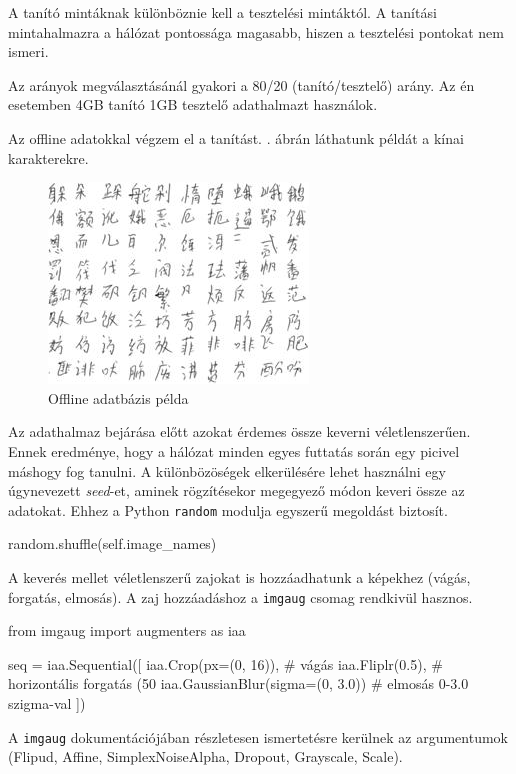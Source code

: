 A tanító mintáknak különböznie kell a tesztelési mintáktól. A tanítási mintahalmazra a hálózat pontossága magasabb, hiszen a tesztelési pontokat nem ismeri.

Az arányok megválasztásánál gyakori a 80/20 (tanító/tesztelő) arány. Az én esetemben 4GB tanító 1GB tesztelő adathalmazt használok.

Az offline adatokkal végzem el a tanítást. . ábrán láthatunk példát a kínai karakterekre.

\begin{figure}[h]
	\centering
	\includegraphics[scale=2.0]{images/offline_dataset}
	\caption{Offline adatbázis példa}
	\label{fig:offline_dataset}
\end{figure} 

Az adathalmaz bejárása előtt azokat érdemes össze keverni véletlenszerűen. Ennek eredménye, hogy a hálózat minden egyes futtatás során egy picivel máshogy fog tanulni. A különbözöségek elkerülésére lehet használni egy úgynevezett \textit{seed}-et, aminek rögzítésekor megegyező módon keveri össze az adatokat. Ehhez a Python \texttt{random} modulja egyszerű megoldást biztosít.
\begin{python}
random.shuffle(self.image_names)
\end{python}

A keverés mellet véletlenszerű zajokat is hozzáadhatunk a képekhez (vágás, forgatás, elmosás). A zaj hozzáadáshoz a \texttt{imgaug} csomag rendkivül hasznos.

\begin{python}
from imgaug import augmenters as iaa

seq = iaa.Sequential([
    iaa.Crop(px=(0, 16)), # vágás 
    iaa.Fliplr(0.5), # horizontális forgatás (50%
    iaa.GaussianBlur(sigma=(0, 3.0)) # elmosás 0-3.0 szigma-val
])
\end{python}

A \texttt{imgaug} dokumentációjában részletesen ismertetésre kerülnek az argumentumok (Flipud, Affine, SimplexNoiseAlpha, Dropout, Grayscale, Scale).

